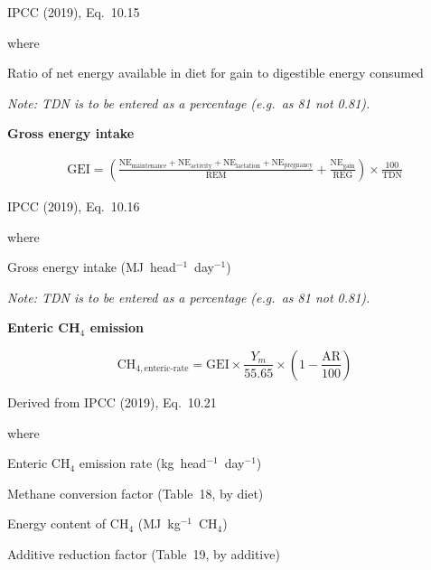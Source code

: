\noindent IPCC (2019), Eq.~10.15

\noindent where
\begin{description}[font=\normalfont, leftmargin=6em, style=sameline, nosep]
    \item[$\mathrm{REG}$] Ratio of net energy available in diet for gain to
          digestible energy consumed
\end{description}

\noindent\textit{Note: TDN is to be entered as a percentage (e.g.\ as 81 not 0.81).}

\bigskip
\noindent\textbf{Gross energy intake}

\begin{multline}
    \mathrm{GEI} =
        \left(\frac{\mathrm{NE}_{\mathrm{maintenance}} + \mathrm{NE}_{\mathrm{activity}}
            + \mathrm{NE}_{\mathrm{lactation}} + \mathrm{NE}_{\mathrm{pregnancy}}}
            {\mathrm{REM}}
        + \frac{\mathrm{NE}_{\mathrm{gain}}}{\mathrm{REG}}\right)
        \times \frac{100}{\mathrm{TDN}}
    \tag{Eq.\ 3.1.1.11}
\end{multline}

\noindent IPCC (2019), Eq.~10.16

\noindent where
\begin{description}[font=\normalfont, leftmargin=6em, style=sameline, nosep]
    \item[$\mathrm{GEI}$] Gross energy intake (MJ~head$^{-1}$~day$^{-1}$)
\end{description}

\noindent\textit{Note: TDN is to be entered as a percentage (e.g.\ as 81 not 0.81).}

\bigskip
\noindent\textbf{Enteric CH$_4$ emission}

\begin{equation}
    \mathrm{CH}_{4,\mathrm{enteric\text{-}rate}} =
        \mathrm{GEI} \times \frac{Y_m}{55.65}
        \times \left(1 - \frac{\mathrm{AR}}{100}\right)
    \tag{Eq.\ 3.1.1.12}
\end{equation}

\noindent Derived from IPCC (2019), Eq.~10.21

\noindent where
\begin{description}[font=\normalfont, leftmargin=9em, style=sameline, nosep]
    \item[$\mathrm{CH}_{4,\mathrm{enteric\text{-}rate}}$] Enteric CH$_4$ emission rate
          (kg~head$^{-1}$~day$^{-1}$)
    \item[$Y_m$] Methane conversion factor (Table~18, by diet)
    \item[$55.65$] Energy content of CH$_4$ (MJ~kg$^{-1}$~CH$_4$)
    \item[$\mathrm{AR}$] Additive reduction factor (Table~19, by additive)
\end{description}

